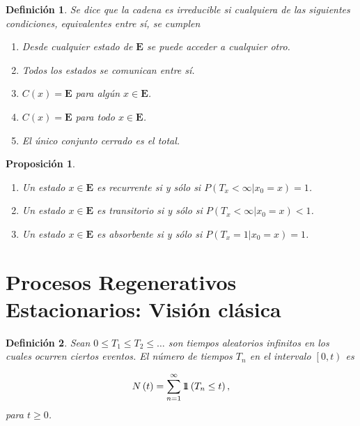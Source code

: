 \documentclass{article}
\newtheorem{Def}{Definición}
\newtheorem{Prop}{Proposición}
\newcommand{\Eb}{\mathbf{E}}
\newcommand{\indora}{\mbox{$1$\hspace{-0.8ex}$1$}}
\begin{document}
\begin{Def}
Se dice que la cadena es irreducible si cualquiera de las siguientes condiciones, equivalentes entre sí,  se cumplen
\begin{enumerate}
\item[a) ] Desde cualquier estado de $\Eb$ se puede acceder a cualquier otro.

\item[b) ] Todos los estados se comunican entre sí.

\item[c) ] $C\left(x\right)=\Eb$ para algún $x\in\Eb$.

\item[d) ] $C\left(x\right)=\Eb$ para todo $x\in\Eb$.

\item[e) ] El único conjunto cerrado es el total.
\end{enumerate}
\end{Def}

\begin{Prop}
\begin{enumerate}
\item[a) ] Un estado $x\in\Eb$ es recurrente si y sólo si $P\left(T_{x}<\infty|x_{0}=x\right)=1$.

\item[b) ] Un estado $x\in\Eb$ es transitorio si y sólo si $P\left(T_{x}<\infty|x_{0}=x\right)<1$.

\item[c) ] Un estado $x\in\Eb$ es absorbente si y sólo si $P\left(T_{x}=1|x_{0}=x\right)=1$.


\end{enumerate}
\end{Prop}

\section{Procesos Regenerativos Estacionarios: Visi\'on cl\'asica}

\begin{Def}\label{Def.Tn}
Sean $0\leq T_{1}\leq T_{2}\leq \ldots$ son tiempos aleatorios infinitos en los cuales ocurren ciertos eventos. El n\'umero de tiempos $T_{n}$ en el intervalo $\left[0,t\right)$ es

\begin{eqnarray}
N\left(t\right)=\sum_{n=1}^{\infty}\indora\left(T_{n}\leq t\right),
\end{eqnarray}
para $t\geq0$.
\end{Def}
\end{document}
